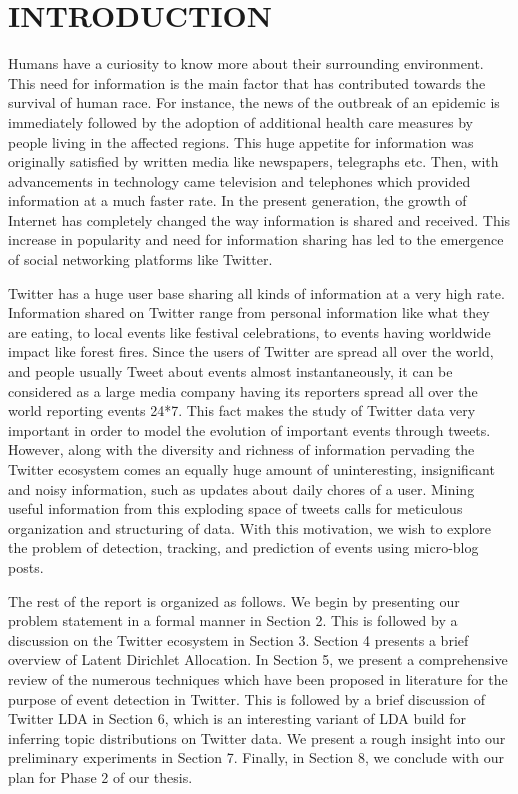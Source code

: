 \section{\uppercase{Introduction}}
Humans have a curiosity to know more about their surrounding environment. This need for information is the main factor that has contributed towards the survival of human race. For instance, the news of the outbreak of an epidemic is immediately followed by the adoption of additional health care measures by people living in the affected regions. This huge appetite for information was originally satisfied by written media like newspapers, telegraphs etc. Then, with advancements in technology came television and telephones which provided information at a much faster rate. In the present generation, the growth of Internet has completely changed the way information is shared and received. This increase in popularity and need for information sharing has led to the emergence of social networking platforms like Twitter.

Twitter has a huge user base sharing all kinds of information at a very high rate. Information shared on Twitter range from personal information like what they are eating, to local events like festival celebrations, to events having worldwide impact like forest fires. Since the users of Twitter are spread all over the world, and people usually Tweet about events almost instantaneously, it can be considered as a large media company having its reporters spread all over the world reporting events 24*7. This fact makes the study of Twitter data very important in order to model the evolution of important events through tweets. However, along with the diversity and richness of information pervading the Twitter ecosystem comes an equally huge amount of uninteresting, insignificant and noisy information, such as updates about daily chores of a user. Mining useful information from this exploding space of tweets calls for meticulous organization and structuring of data. With this motivation, we wish to explore the problem of detection, tracking, and prediction of events using micro-blog posts.

The rest of the report is organized as follows. We begin by presenting our problem statement in a formal manner in Section 2. This is followed by a discussion on the Twitter ecosystem in Section 3. Section 4 presents a brief overview of Latent Dirichlet Allocation. In Section 5, we present a comprehensive review of the numerous techniques which have been proposed in literature for the purpose of event detection in Twitter. This is followed by a brief discussion of Twitter LDA in Section 6, which is an interesting variant of LDA build for inferring topic distributions on Twitter data. We present a rough insight into our preliminary experiments in Section 7. Finally, in Section 8, we conclude with our plan for Phase 2 of our thesis.